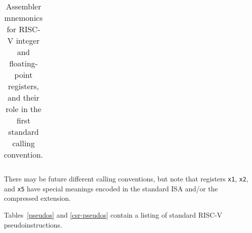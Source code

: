 \begin{table*}[htbp]
\begin{center}
\begin{tabular}{|l|l|l|l|}
 \end{tabular}
\end{center}
\caption{Assembler mnemonics for RISC-V integer and floating-point
  registers, and their role in the first standard calling convention.}
\label{regmap}
\end{table*}

\pagebreak

\begin{commentary}
  There may be future different calling conventions, but note that
  registers {\tt x1}, {\tt x2}, and {\tt x5} have special meanings
  encoded in the standard ISA and/or the compressed extension.
\end{commentary}

Tables~\ref{pseudos} and \ref{csr-pseudos} contain a listing of standard
RISC-V pseudoinstructions.


